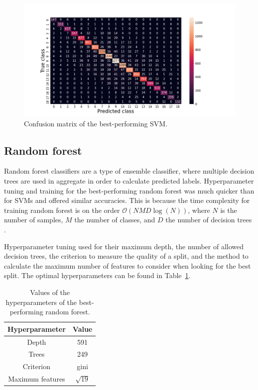 \documentclass[11pt,a4paper]{article}
\begin{document}
\begin{figure}[h]
    \centering
    \includegraphics[width=\columnwidth, keepaspectratio]{../confusion_SVM.png}
    \caption{Confusion matrix of the best-performing SVM.}\label{fig:svm_confusion}
\end{figure}

\clearpage
\subsection{Random forest}
Random forest classifiers are a type of ensemble classifier, where multiple decision trees are used in aggregate in order to calculate predicted labels. Hyperparameter tuning and training for the best-performing random forest was much quicker than for SVMs and offered similar accuracies. This is because the time complexity for training random forest is on the order $\mathcal{O}(N M D \log({N}) )$, where $N$ is the number of samples, $M$ the number of classes, and $D$ the number of decision trees \citep{Zheng2021}.

Hyperparameter tuning used for their maximum depth, the number of allowed decision trees, the criterion to measure the quality of a split, and the method to calculate the maximum number of features to consider when looking for the best split. The optimal hyperparameters can be found in Table~\ref{tab:rf_hyperparameter}.

\begin{table}[ht]
    \centering
    \begin{tabular}{c|c}
        Hyperparameter & Value\\
        \hline
        Depth & 591 \\
        Trees & 249 \\
        Criterion & gini \\
        Maximum features & $\sqrt{19}$\\
    \end{tabular}
    \caption{Values of the hyperparameters of the best-performing random forest.}\label{tab:rf_hyperparameter}
\end{table}
\end{document}
